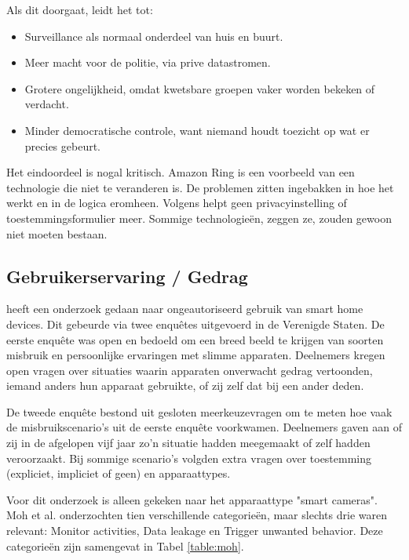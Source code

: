 \documentclass[nonacm,sigconf]{acmart}
\begin{document}
    \noindent Als dit doorgaat, leidt het tot:
    \begin{itemize}
        \item Surveillance als normaal onderdeel van huis en buurt.
        \item Meer macht voor de politie, via prive datastromen.
        \item Grotere ongelijkheid, omdat kwetsbare groepen vaker worden bekeken of verdacht.
        \item Minder democratische controle, want niemand houdt toezicht op wat er precies gebeurt.
    \end{itemize}

    \noindent Het eindoordeel is nogal kritisch.
    Amazon Ring is een voorbeeld van een technologie die niet te veranderen is.
    De problemen zitten ingebakken in hoe het werkt en in de logica eromheen.
    Volgens \citeauthor{selinger2022amazon} helpt geen privacyinstelling of toestemmingsformulier meer.
    Sommige technologieën, zeggen ze, zouden gewoon niet moeten bestaan.

    \subsection{Gebruikerservaring / Gedrag}


    \parencite{moh2023characterizing} heeft een onderzoek gedaan naar ongeautoriseerd gebruik van smart home devices.
    Dit gebeurde via twee enquêtes uitgevoerd in de Verenigde Staten.
    De eerste enquête was open en bedoeld om een breed beeld te krijgen van soorten misbruik en persoonlijke ervaringen met slimme apparaten.
    Deelnemers kregen open vragen over situaties waarin apparaten onverwacht gedrag vertoonden, iemand anders hun apparaat gebruikte, of zij zelf dat bij een ander deden.

    De tweede enquête bestond uit gesloten meerkeuzevragen om te meten hoe vaak de misbruikscenario's uit de eerste enquête voorkwamen.
    Deelnemers gaven aan of zij in de afgelopen vijf jaar zo'n situatie hadden meegemaakt of zelf hadden veroorzaakt.
    Bij sommige scenario's volgden extra vragen over toestemming (expliciet, impliciet of geen) en apparaattypes.

    Voor dit onderzoek is alleen gekeken naar het apparaattype "smart cameras".
    Moh et al. onderzochten tien verschillende categorieën, maar slechts drie waren relevant: Monitor activities, Data leakage en Trigger unwanted behavior.
    Deze categorieën zijn samengevat in Tabel \ref{table:moh}.
\end{document}
